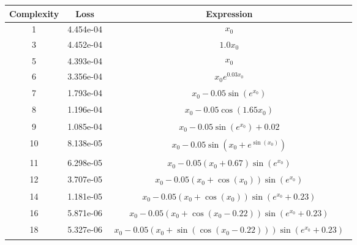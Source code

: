 \begin{center}
        \begin{tabular}{|c|c|c|}
        \hline
        Complexity & Loss & Expression \\
        \hline
        1 & 4.454e-04 & $\begin{aligned}x_{0}\end{aligned}$\\ \hline3 & 4.452e-04 & $\begin{aligned}1.0 x_{0}\end{aligned}$\\ \hline5 & 4.393e-04 & $\begin{aligned}x_{0}\end{aligned}$\\ \hline6 & 3.356e-04 & $\begin{aligned}x_{0} e^{0.03 x_{0}}\end{aligned}$\\ \hline7 & 1.793e-04 & $\begin{aligned}x_{0} - 0.05 \sin{\left(e^{x_{0}} \right)}\end{aligned}$\\ \hline8 & 1.196e-04 & $\begin{aligned}x_{0} - 0.05 \cos{\left(1.65 x_{0} \right)}\end{aligned}$\\ \hline9 & 1.085e-04 & $\begin{aligned}x_{0} - 0.05 \sin{\left(e^{x_{0}} \right)} + 0.02\end{aligned}$\\ \hline10 & 8.138e-05 & $\begin{aligned}x_{0} - 0.05 \sin{\left(x_{0} + e^{\sin{\left(x_{0} \right)}} \right)}\end{aligned}$\\ \hline11 & 6.298e-05 & $\begin{aligned}x_{0} - 0.05 \left(x_{0} + 0.67\right) \sin{\left(e^{x_{0}} \right)}\end{aligned}$\\ \hline12 & 3.707e-05 & $\begin{aligned}x_{0} - 0.05 \left(x_{0} + \cos{\left(x_{0} \right)}\right) \sin{\left(e^{x_{0}} \right)}\end{aligned}$\\ \hline14 & 1.181e-05 & $\begin{aligned}x_{0} - 0.05 \left(x_{0} + \cos{\left(x_{0} \right)}\right) \sin{\left(e^{x_{0}} + 0.23 \right)}\end{aligned}$\\ \hline16 & 5.871e-06 & $\begin{aligned}x_{0} - 0.05 \left(x_{0} + \cos{\left(x_{0} - 0.22 \right)}\right) \sin{\left(e^{x_{0}} + 0.23 \right)}\end{aligned}$\\ \hline18 & 5.327e-06 & $\begin{aligned}x_{0} - 0.05 \left(x_{0} + \sin{\left(\cos{\left(x_{0} - 0.22 \right)} \right)}\right) \sin{\left(e^{x_{0}} + 0.23 \right)}\end{aligned}$\\ \hline\end{tabular}
        \end{center}
        